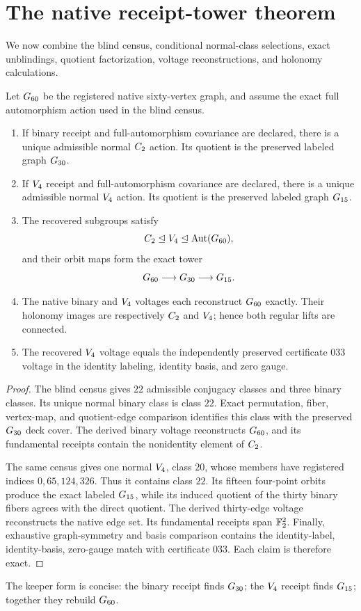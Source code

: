\section{The native receipt-tower theorem}

We now combine the blind census, conditional normal-class selections,
exact unblindings, quotient factorization, voltage reconstructions, and
holonomy calculations.

\begin{theorem}
Let \(G_{60}\) be the registered native sixty-vertex graph, and assume
the exact full automorphism action used in the blind census.

\begin{enumerate}
\item If binary receipt and full-automorphism covariance are declared,
there is a unique admissible normal \(C_{2}\) action.  Its quotient is
the preserved labeled graph \(G_{30}\).

\item If \(V_{4}\) receipt and full-automorphism covariance are
declared, there is a unique admissible normal \(V_{4}\) action.  Its
quotient is the preserved labeled graph \(G_{15}\).

\item The recovered subgroups satisfy
\[
  C_{2}\trianglelefteq V_{4}
  \trianglelefteq\operatorname{Aut}(G_{60}),
\]
and their orbit maps form the exact tower
\[
  G_{60}\longrightarrow G_{30}\longrightarrow G_{15}.
\]

\item The native binary and \(V_{4}\) voltages each reconstruct
\(G_{60}\) exactly.  Their holonomy images are respectively
\(C_{2}\) and \(V_{4}\); hence both regular lifts are connected.

\item The recovered \(V_{4}\) voltage equals the independently
preserved certificate 033 voltage in the identity labeling, identity
basis, and zero gauge.
\end{enumerate}
\end{theorem}

\begin{proof}
The blind census gives \(22\) admissible conjugacy classes and three
binary classes.  Its unique normal binary class is class \(22\).
Exact permutation, fiber, vertex-map, and quotient-edge comparison
identifies this class with the preserved \(G_{30}\) deck cover.
The derived binary voltage reconstructs \(G_{60}\), and its
fundamental receipts contain the nonidentity element of \(C_{2}\).

The same census gives one normal \(V_{4}\), class \(20\), whose
members have registered indices \(0,65,124,326\).  Thus it contains
class \(22\).  Its fifteen four-point orbits produce the exact labeled
\(G_{15}\), while its induced quotient of the thirty binary fibers
agrees with the direct quotient.  The derived thirty-edge voltage
reconstructs the native edge set.  Its fundamental receipts span
\(\mathbb{F}_{2}^2\).  Finally, exhaustive graph-symmetry and basis comparison
contains the identity-label, identity-basis, zero-gauge match with
certificate 033.  Each claim is therefore exact.
\end{proof}

The keeper form is concise: the binary receipt finds \(G_{30}\); the
\(V_{4}\) receipt finds \(G_{15}\); together they rebuild
\(G_{60}\).
